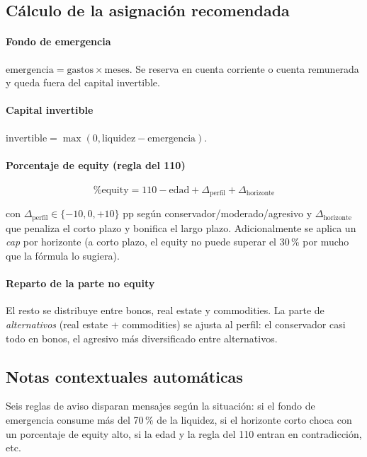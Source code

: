 \documentclass[11pt,a4paper]{article}
\begin{document}
\subsection{Cálculo de la asignación recomendada}

\paragraph{Fondo de emergencia}
$\mathrm{emergencia} = \mathrm{gastos} \times \mathrm{meses}$. Se reserva en cuenta corriente o cuenta remunerada y queda fuera del capital invertible.

\paragraph{Capital invertible}
$\mathrm{invertible} = \max(0, \mathrm{liquidez} - \mathrm{emergencia})$.

\paragraph{Porcentaje de equity (regla del 110)}
\begin{equation}
\%\mathrm{equity} = 110 - \mathrm{edad} + \Delta_{\text{perfil}} + \Delta_{\text{horizonte}}
\end{equation}

con $\Delta_{\text{perfil}} \in \{-10, 0, +10\}$ pp según conservador/moderado/agresivo y $\Delta_{\text{horizonte}}$ que penaliza el corto plazo y bonifica el largo plazo. Adicionalmente se aplica un \textit{cap} por horizonte (a corto plazo, el equity no puede superar el 30\,\% por mucho que la fórmula lo sugiera).

\paragraph{Reparto de la parte no equity}
El resto se distribuye entre bonos, real estate y commodities. La parte de \textit{alternativos} (real estate + commodities) se ajusta al perfil: el conservador casi todo en bonos, el agresivo más diversificado entre alternativos.

\subsection{Notas contextuales automáticas}

Seis reglas de aviso disparan mensajes según la situación: si el fondo de emergencia consume más del 70\,\% de la liquidez, si el horizonte corto choca con un porcentaje de equity alto, si la edad y la regla del 110 entran en contradicción, etc.
\end{document}
